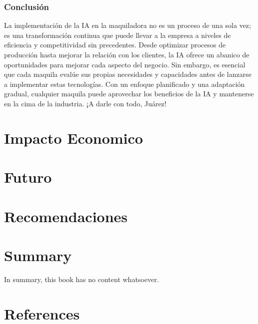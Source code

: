 \documentclass[
  10pt,
  letterpaper,
]{book}
\begin{document}
\subsection{Conclusión}\label{conclusiuxf3n-1}

La implementación de la IA en la maquiladora no es un proceso de una
sola vez; es una transformación continua que puede llevar a la empresa a
niveles de eficiencia y competitividad sin precedentes. Desde optimizar
procesos de producción hasta mejorar la relación con los clientes, la IA
ofrece un abanico de oportunidades para mejorar cada aspecto del
negocio. Sin embargo, es esencial que cada maquila evalúe sus propias
necesidades y capacidades antes de lanzarse a implementar estas
tecnologías. Con un enfoque planificado y una adaptación gradual,
cualquier maquila puede aprovechar los beneficios de la IA y mantenerse
en la cima de la industria. ¡A darle con todo, Juárez!


\chapter{Impacto Economico}\label{impacto-economico}


\chapter{Futuro}\label{futuro}


\chapter{Recomendaciones}\label{recomendaciones}


\chapter{Summary}\label{summary}

In summary, this book has no content whatsoever.


\chapter*{References}\label{references}
\end{document}
